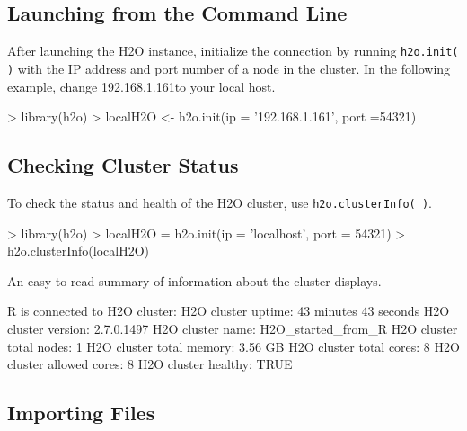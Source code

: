 \documentclass[11pt]{article}
\begin{document}
\subsection{Launching from the Command Line}

After launching the H2O instance, initialize the connection by running {\texttt{h2o.init( )}} with the IP address and port number of a node in the cluster. In the following example, change 192.168.1.161to your local host. 
\begin{spverbatim}
> library(h2o)
> localH2O <- h2o.init(ip = '192.168.1.161', port =54321)
\end{spverbatim}

\subsection{Checking Cluster Status}


To check the status and health of the H2O cluster, use {\texttt{h2o.clusterInfo( )}}.
\begin{spverbatim}
> library(h2o)
> localH2O = h2o.init(ip = 'localhost', port = 54321)
> h2o.clusterInfo(localH2O)
\end{spverbatim}

An easy-to-read summary of information about the cluster displays. 
\begin{spverbatim}
R is connected to H2O cluster:
  H2O cluster uptime:         43 minutes 43 seconds
  H2O cluster version:        2.7.0.1497
  H2O cluster name:           H2O_started_from_R
  H2O cluster total nodes:    1
  H2O cluster total memory:   3.56 GB
  H2O cluster total cores:    8
  H2O cluster allowed cores:  8
  H2O cluster healthy:        TRUE
\end{spverbatim}

\subsection{Importing Files}
\end{document}
